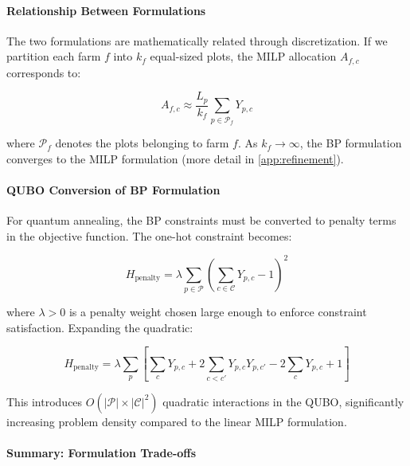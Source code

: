\documentclass{oqireport}
\begin{document}
\paragraph{Relationship Between Formulations}

The two formulations are mathematically related through discretization. If we partition each farm $f$ into $k_f$ equal-sized plots, the MILP allocation $A_{f,c}$ corresponds to:

\begin{equation}
A_{f,c} \approx \frac{L_p}{k_f} \sum_{p \in \mathcal{P}_f} Y_{p,c}
\end{equation}

where $\mathcal{P}_f$ denotes the plots belonging to farm $f$. As $k_f \to \infty$, the BP formulation converges to the MILP formulation (more detail in \cref{app:refinement}).

\paragraph{QUBO Conversion of BP Formulation}

For quantum annealing, the BP constraints must be converted to penalty terms in the objective function. The one-hot constraint becomes:

\begin{equation}
H_{\text{penalty}} = \lambda \sum_{p \in \mathcal{P}} \left( \sum_{c \in \mathcal{C}} Y_{p,c} - 1 \right)^2
\label{eq:qubo_penalty}
\end{equation}

where $\lambda > 0$ is a penalty weight chosen large enough to enforce constraint satisfaction. Expanding the quadratic:

\begin{equation}
H_{\text{penalty}} = \lambda \sum_{p} \left[ \sum_c Y_{p,c} + 2\sum_{c < c'} Y_{p,c} Y_{p,c'} - 2\sum_c Y_{p,c} + 1 \right]
\end{equation}

This introduces $O(|\mathcal{P}| \times |\mathcal{C}|^2)$ quadratic interactions in the QUBO, significantly increasing problem density compared to the linear MILP formulation.

\paragraph{Summary: Formulation Trade-offs}
\end{document}
